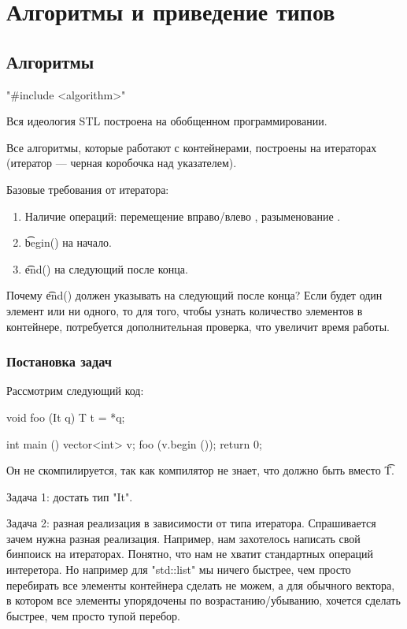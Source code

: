 
\chapter{Алгоритмы и приведение типов}
\section{Алгоритмы}

\cpp"#include <algorithm>"

Вся идеология STL построена на обобщенном программировании. 

Все алгоритмы, которые работают с контейнерами, построены на итераторах (итератор --- черная коробочка над указателем).

Базовые требования от итератора:
\begin{enumerate}
    \item Наличие операций: перемещение вправо/влево \cpp{--, ++}, разыменование \cpp{*->, *}. 
    \item \t{begin()} на начало.
    \item \t{end()} на следующий после конца.
\end{enumerate}

Почему \t{end()} должен указывать на следующий после конца? 
Если будет один элемент или ни одного, то для того, чтобы узнать количество элементов в контейнере, потребуется дополнительная проверка, что увеличит время работы. 

\subsection{Постановка задач}

Рассмотрим следующий код:
\begin{cppcode}
void foo (It q){
    T t = *q;
}

int main () {
    vector<int> v;
    foo (v.begin ());
    return 0; 
}
\end{cppcode}
Он не скомпилируется, так как компилятор не знает, что должно быть вместо \t{T}.

Задача 1: достать тип \cpp"It". 

Задача 2: разная реализация в зависимости от типа итератора.
Спрашивается зачем нужна разная реализация. 
Например, нам захотелось написать свой бинпоиск на итераторах. 
Понятно, что нам не хватит стандартных операций интеретора. 
Но например для \cpp"std::list" мы ничего быстрее, чем просто перебирать все элементы контейнера сделать не можем, а для обычного вектора, в котором все элементы упорядочены по возрастанию/убыванию, хочется сделать быстрее, чем просто тупой перебор. 

